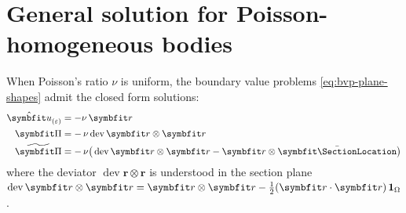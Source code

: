 
\section{General solution for Poisson-homogeneous bodies}\label{sec:iesan-poisson}

When Poisson's ratio \(\nu\) is uniform, the boundary value problems \eqref{eq:bvp-plane-shapes} admit the closed form solutions:
\begin{subequations}
\begin{align}
\PlaneAxialShape&=-\nu\,\bm{r} \\
 \PlaneShape &=  -\,\nu \operatorname{dev}\bm{r}\otimes\bm{r}\\
 \PlaneShearShape &=  -\,\nu\big(\operatorname{dev}\bm{r}\otimes\bm{r}-\bm{r}\otimes\CentroidLocation\big)
\end{align}
\label{eq:ph-plane-shapes}
\end{subequations}
where the deviator \(\operatorname{dev}\bm{r}\otimes\bm{r}\) is understood in the section plane 
\(\operatorname{dev}\bm{r}\otimes\bm{r}=\bm{r}\otimes\bm{r}-\tfrac12(\bm{r}\cdot\bm{r})\,\oneS\). 

